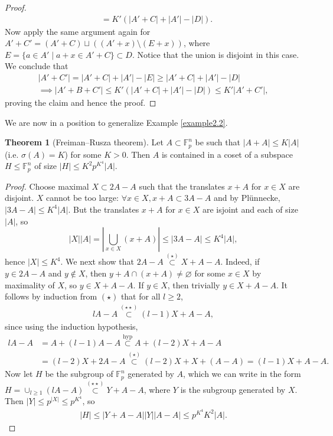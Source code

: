 \documentclass{article}
\theoremstyle{definition}
\newtheorem{theorem}{Theorem}[section]
\begin{document}
\begin{proof}
\begin{align*}
        &= K'(\left|A'+C\right|+\left|A'\right|-\left|D\right|).
    \end{align*}
    Now apply the same argument again for $A'+C' = (A' + C) \sqcup ((A'+x)\setminus (E+x))$, where $E = \{a \in A' \mid a+x \in A'+C\} \subset D$. Notice that the union is disjoint in this case. We conclude that 
    \begin{align*}
        \left|A'+C'\right| = \left|A'+C\right| + \left|A'\right| - \left|E\right| \ge \left|A'+C\right| + \left|A'\right| - \left|D\right|\\
        \implies \left|A'+B+C'\right|\le K'(\left|A'+C\right|+\left|A'\right|-\left|D\right|)\le K'\left|A'+C'\right|,
    \end{align*}
    proving the claim and hence the proof.
\end{proof}
We are now in a position to generalize Example \ref{example2.2}.
\begin{theorem}[Freiman--Rusza theorem]
    Let $A \subset \mathbb{F}_p^n$ be such that $\left|A+A\right|\le K\left|A\right|$ (i.e. $\sigma(A)=K$) for some $K>0$. Then $A$ is contained in a coset of a subspace $H\le \mathbb{F}_p^n$ of size $\left|H\right|\le K^2p^{K^4}\left|A\right|$.
\end{theorem}
\begin{proof}
    Choose maximal $X \subset 2A-A$ such that the translates $x+A$ for $x \in X$ are disjoint. $X$ cannot be too large: $\forall x \in X, x+A \subset 3A-A$ and by Plünnecke, $\left|3A-A\right| \le K^4\left|A\right|$. But the translates $x+A$ for $x \in X$ are isjoint and each of size $\left|A\right|$, so
    \[
    \left|X\right|\left|A\right| = \left|\bigcup_{x \in X}(x+A) \right|\le \left|3A-A\right| \le K^4\left|A\right|,
    \]
    hence $\left|X\right|\le K^4$. We next show that $2A-A \stackrel{(\star)}{\subset}  X+A-A$. Indeed, if $y \in 2A-A$ and $y \not\in X$, then $y+A \cap (x+A) \neq \varnothing$ for some $x \in X$ by maximality of $X$, so $y \in X+A-A$. If $y \in X$, then trivially $y \in X+A-A$. It follows by induction from $(\star)$ that for all $l\ge 2$,
    \begin{align*}
        lA-A \stackrel{(\star\star)}{\subset}  (l-1)X + A -A,
    \end{align*}
    since using the induction hypothesis,
    \begin{align*}
        lA-A &= A+(l-1)A - A \stackrel{\text{hyp}}{\subset} A + (l-2)X + A - A \\
        &= (l-2)X + 2A - A \stackrel{(\star)}{\subset } (l-2)X +X +(A-A) = (l-1)X+A-A.
    \end{align*}
    Now let $H$ be the subgroup of $\mathbb{F}_p^n$ generated by $A$, which we can write in the form $H = \cup_{l\ge 1}(lA-A) \stackrel{(\star\star)}{\subset} Y+A-A$, where $Y$ is the subgroup generated by $X$. Then $\left|Y\right|\le p^{\left|X\right|} \le p^{K^4}$, so
    \begin{align*}
        \left|H\right|\le \left|Y+A-A\right|\left|Y\right|\left|A-A\right|\le p^{K^4}K^2\left|A\right|.
    \end{align*}
\end{proof}
\end{document}
